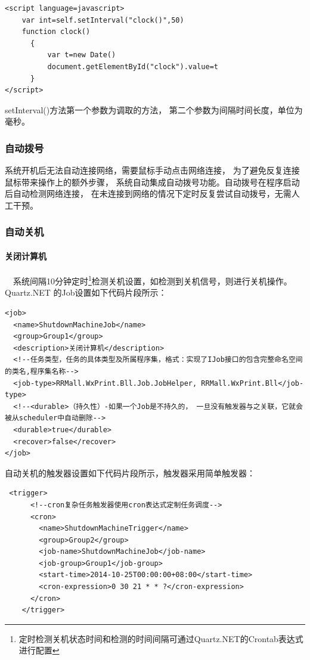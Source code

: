 \documentclass{book}
\begin{document}
\begin{lstlisting}
<script language=javascript>
	var int=self.setInterval("clock()",50)
	function clock()
	  {
		  var t=new Date()
		  document.getElementById("clock").value=t
	  }
</script>
\end{lstlisting}

setInterval()方法第一个参数为调取的方法，
第二个参数为间隔时间长度，单位为毫秒。

\subsubsection{自动拨号}

系统开机后无法自动连接网络，需要鼠标手动点击网络连接，
为了避免反复连接鼠标带来操作上的额外步骤，
系统自动集成自动拨号功能。自动拨号在程序启动后自动检测网络连接，
在未连接到网络的情况下定时反复尝试自动拨号，无需人工干预。

\subsubsection{自动关机}

\paragraph{关闭计算机}~~系统间隔10分钟定时\footnote{定时检测关机状态时间和检测的时间间隔可通过Quartz.NET的Crontab表达式进行配置}检测关机设置，如检测到关机信号，则进行关机操作。Quartz.NET
的Job设置如下代码片段所示：

\begin{lstlisting}
<job>
  <name>ShutdownMachineJob</name>
  <group>Group1</group>
  <description>关闭计算机</description>
  <!--任务类型，任务的具体类型及所属程序集，格式：实现了IJob接口的包含完整命名空间的类名,程序集名称-->
  <job-type>RRMall.WxPrint.Bll.Job.JobHelper, RRMall.WxPrint.Bll</job-type>
  <!--<durable>（持久性）-如果一个Job是不持久的， 一旦没有触发器与之关联，它就会被从scheduler中自动删除-->
  <durable>true</durable>
  <recover>false</recover>
</job>
\end{lstlisting}

自动关机的触发器设置如下代码片段所示，触发器采用简单触发器：
\begin{lstlisting}
 <trigger>
      <!--cron复杂任务触发器使用cron表达式定制任务调度-->
      <cron>
        <name>ShutdownMachineTrigger</name>
        <group>Group2</group>
        <job-name>ShutdownMachineJob</job-name>
        <job-group>Group1</job-group>
        <start-time>2014-10-25T00:00:00+08:00</start-time>
        <cron-expression>0 30 21 * * ?</cron-expression>
      </cron>
    </trigger>
\end{lstlisting}
\end{document}
